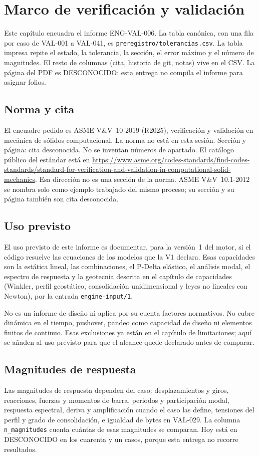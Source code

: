 \chapter{Marco de verificación y validación}\label{sec:marco-vv10}
Este capítulo encuadra el informe ENG-VAL-006. La tabla canónica, con una fila por caso de VAL-001 a VAL-041, es \texttt{preregistro/tolerancias.csv}. La tabla impresa repite el estado, la tolerancia, la sección, el error máximo y el número de magnitudes. El resto de columnas (cita, historia de git, notas) vive en el CSV. La página del PDF es DESCONOCIDO: esta entrega no compila el informe para asignar folios.

\section{Norma y cita}
El encuadre pedido es ASME V\&V~10-2019 (R2025), verificación y validación en mecánica de sólidos computacional. La norma no está en esta sesión. Sección y página: cita desconocida. No se inventan números de apartado. El catálogo público del estándar está en \url{https://www.asme.org/codes-standards/find-codes-standards/standard-for-verification-and-validation-in-computational-solid-mechanics}. Esa dirección no es una sección de la norma. ASME V\&V~10.1-2012 se nombra solo como ejemplo trabajado del mismo proceso; su sección y su página también son cita desconocida.

\section{Uso previsto}
El uso previsto de este informe es documentar, para la versión~1 del motor, si el código resuelve las ecuaciones de los modelos que la V1 declara. Esas capacidades son la estática lineal, las combinaciones, el P-Delta elástico, el análisis modal, el espectro de respuesta y la geotecnia descrita en el capítulo de capacidades (Winkler, perfil geostático, consolidación unidimensional y leyes no lineales con Newton), por la entrada \texttt{engine-input/1}.

No es un informe de diseño ni aplica por su cuenta factores normativos. No cubre dinámica en el tiempo, pushover, pandeo como capacidad de diseño ni elementos finitos de continuo. Esas exclusiones ya están en el capítulo de limitaciones; aquí se añaden al uso previsto para que el alcance quede declarado antes de comparar.

\section{Magnitudes de respuesta}
Las magnitudes de respuesta dependen del caso: desplazamientos y giros, reacciones, fuerzas y momentos de barra, periodos y participación modal, respuesta espectral, deriva y amplificación cuando el caso las define, tensiones del perfil y grado de consolidación, e igualdad de bytes en VAL-029. La columna \texttt{n\_magnitudes} cuenta cuántas de esas magnitudes se comparan. Hoy está en DESCONOCIDO en los cuarenta y un casos, porque esta entrega no recorre resultados.

